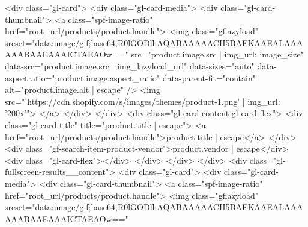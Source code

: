 {{{{{{{{{{{{{{{{{{{{{{{{{{{{{{{{{{{{{{{{{{{{{{{{{{{                    <div class="gl-card">
                      <div class="gl-card-media">
                        <div class="gl-card-thumbnail">
                          <a class="spf-image-ratio" href="{{root_url}}/products/{{product.handle}}">
                            {%
                            <img 
                              class="gflazyload"
                              srcset="data:image/gif;base64,R0lGODlhAQABAAAAACH5BAEKAAEALAAAAAABAAEAAAICTAEAOw=="
                              src="{{product.image.src | img_url: image_size}}"
                              data-src="{{product.image.src | img_lazyload_url}}"
                              data-sizes="auto"
                              data-aspectratio="{{product.image.aspect_ratio}}"
                              data-parent-fit="contain"
                              alt="{{product.image.alt | escape}}"
                            />
                            {%
                            <img src="{{'https://cdn.shopify.com/s/images/themes/product-1.png' | img_url: '200x'}}">
                            {%
                          </a>
                        </div>
                      </div>
                      <div class="gl-card-content gl-card-flex">
                        <div class="gl-card-title" title="{{product.title | escape}}">
                          <a href="{{root_url}}/products/{{product.handle}}">{{product.title | escape}}</a>
                        </div>
                                                {%
                        <div class="gf-search-item-product-vendor">{{product.vendor | escape}}</div>
                        {%
                                                                                                <div class="gl-card-flex"></div>
                                              </div>
                    </div>
                    {%
                  </div>
                  {%
                  <div class="gl-fullscreen-results__content">
                    {%
                    <div class="gl-card">
                      <div class="gl-card-media">
                        <div class="gl-card-thumbnail">
                          <a class="spf-image-ratio" href="{{root_url}}/products/{{product.handle}}">
                            {%
                            <img 
                              class="gflazyload"
                              srcset="data:image/gif;base64,R0lGODlhAQABAAAAACH5BAEKAAEALAAAAAABAAEAAAICTAEAOw=="
}}}}}}}}}}}}}}}}}}}}}}}}}}}}}}}}}}}}}}}}}}}}}}}}}}}}}}}}}}}}
